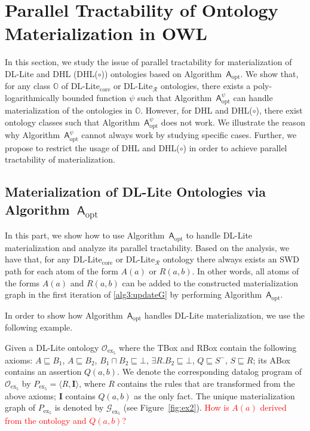 \section{Parallel Tractability of Ontology Materialization in OWL}
\label{sec:ptonto}

In this section, we study the issue of parallel tractability
for materialization of DL-Lite and DHL (DHL($\circ$)) ontologies
based on Algorithm~$\mathsf{A}_{\text{opt}}$. We show that, for any class $\mathbb{O}$ of
DL-Lite$_{\text{core}}$ or DL-Lite$_\mathcal{R}$ ontologies,
there exists a poly-logarithmically bounded function $\psi$
such that Algorithm~$\mathsf{A}_{\text{opt}}^{\psi}$ can handle materialization of the ontologies in $\mathbb{O}$.
However, for DHL and DHL($\circ$), there exist ontology classes such that Algorithm~$\mathsf{A}_{\text{opt}}^\psi$
does not work. We illustrate the reason why Algorithm~$\mathsf{A}_{\text{opt}}^\psi$ cannot always
work by studying specific cases.
Further, we propose to restrict the usage of DHL and DHL($\circ$) in order to achieve parallel tractability
of materialization.

\subsection{Materialization of DL-Lite Ontologies via Algorithm~$\mathsf{A}_{\text{opt}}$}

In this part, we show how to use Algorithm~$\mathsf{A}_{\text{opt}}$ to handle
DL-Lite materialization and analyze its parallel tractability.
Based on the analysis, we have that, for any DL-Lite$_{\text{core}}$ or DL-Lite$_\mathcal{R}$ ontology
there always exists an SWD path for each atom of the form $A(a)$ or $R(a,b)$.
In other words, all atoms of the forms $A(a)$ and $R(a,b)$ can be added to
the constructed materialization graph in the first iteration of \ref{alg3:updateG}
by performing Algorithm~$\mathsf{A}_{\text{opt}}$.

In order to show how Algorithm~$\mathsf{A}_{\text{opt}}$ handles DL-Lite materialization,
we use the following example.

\begin{example}\label{exp:dllite}
Given a DL-Lite ontology $\mathcal{O}_{\text{ex}_5}$
where the TBox and RBox contain the following axioms:
$A\sqsubseteq B_1$, $A\sqsubseteq B_2$, $B_1\sqcap B_2\sqsubseteq\bot$,
$\exists R.B_2\sqsubseteq\bot$, $Q\sqsubseteq S^-$, $S\sqsubseteq R$;
its ABox contains an assertion $Q(a,b)$.
We denote the corresponding datalog program of $\mathcal{O}_{\text{ex}_5}$ by $P_{\text{ex}_5}=\langle R, \textbf{I}\rangle$,
where $R$ contains the rules that are transformed from the above axioms; $\textbf{I}$ contains $Q(a,b)$
as the only fact.
The unique materialization graph of $P_{\text{ex}_5}$ is denoted by
$\mathcal{G}_{\text{ex}_5}$ (see
Figure~\ref{fig:ex2}). \textcolor{red}{How is $A(a)$ derived from the
  ontology and $Q(a, b)$?}
\end{example}

